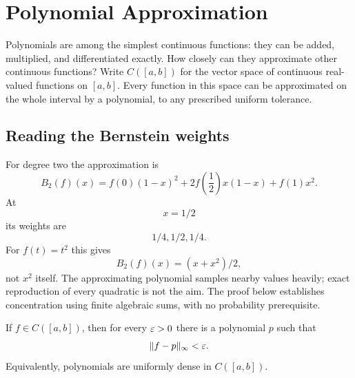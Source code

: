 \section{Polynomial Approximation}

Polynomials are among the simplest continuous functions: they can be added,
multiplied, and differentiated exactly. How closely can they approximate
other continuous functions? Write $C([a,b])$ for the vector space of
continuous real-valued functions on $[a,b]$. Every function in this space
can be approximated on the whole interval by a polynomial, to any
prescribed uniform tolerance.

\subsection*{Reading the Bernstein weights}
For degree two the approximation is
\[
B_2(f)(x)=f(0)(1-x)^2+2f\left(\frac12\right)x(1-x)+f(1)x^2.
\]
At
\[
x=1/2
\]
 its weights are
\[
1/4,1/2,1/4.
\]
 For $f(t)=t^2$ this
gives
\[
B_2(f)(x)=(x+x^2)/2,
\]
 not $x^2$ itself. The approximating
polynomial samples nearby values heavily; exact reproduction of every
quadratic is not the aim. The proof below establishes concentration using
finite algebraic sums, with no probability prerequisite.
\begin{theorem}
\label{thm:weierstrass-approximation}
If $f\in C([a,b])$, then for every $\varepsilon>0$ there is a polynomial $p$ such
that
\[
\lVert f-p\rVert_\infty<\varepsilon.
\]
Equivalently, polynomials are uniformly dense in $C([a,b])$.
\end{theorem}
